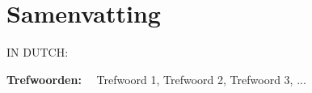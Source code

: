 \chapter*{Samenvatting}

IN DUTCH:
\lipsum[1-4]


\vspace*{11pt}\noindent
\textbf{Trefwoorden:} \ \ Trefwoord 1, Trefwoord 2, Trefwoord 3, ...

